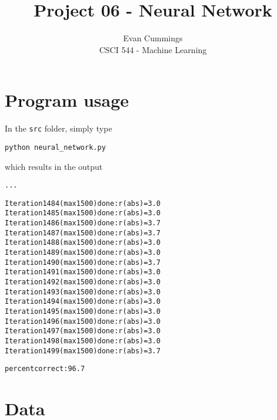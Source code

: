
\DeclareMathOperator*{\argmax}{arg\,max}

\usepackage[top=.5in, bottom=1in, left=.75in, right=.75in]{geometry}
\usepackage{framed}
\setlength{\columnsep}{8mm}


\small
\twocolumn

\title{Project 06 - Neural Network}
\author{Evan Cummings\\
CSCI 544 - Machine Learning}

\maketitle

\section{Program usage}

In the \texttt{src} folder, simply type

\centerline{\texttt{python neural\_network.py}}

\noindent which results in the output

\begin{shaded}
\scriptsize
\begin{alltt}
...

Iteration 1484 (max 1500) done: r (abs) = 3.0% (tol 2.0%) 
Iteration 1485 (max 1500) done: r (abs) = 3.0% (tol 2.0%) 
Iteration 1486 (max 1500) done: r (abs) = 3.7% (tol 2.0%) 
Iteration 1487 (max 1500) done: r (abs) = 3.7% (tol 2.0%) 
Iteration 1488 (max 1500) done: r (abs) = 3.0% (tol 2.0%) 
Iteration 1489 (max 1500) done: r (abs) = 3.0% (tol 2.0%) 
Iteration 1490 (max 1500) done: r (abs) = 3.7% (tol 2.0%) 
Iteration 1491 (max 1500) done: r (abs) = 3.0% (tol 2.0%) 
Iteration 1492 (max 1500) done: r (abs) = 3.0% (tol 2.0%) 
Iteration 1493 (max 1500) done: r (abs) = 3.0% (tol 2.0%) 
Iteration 1494 (max 1500) done: r (abs) = 3.0% (tol 2.0%) 
Iteration 1495 (max 1500) done: r (abs) = 3.0% (tol 2.0%) 
Iteration 1496 (max 1500) done: r (abs) = 3.0% (tol 2.0%) 
Iteration 1497 (max 1500) done: r (abs) = 3.0% (tol 2.0%) 
Iteration 1498 (max 1500) done: r (abs) = 3.0% (tol 2.0%) 
Iteration 1499 (max 1500) done: r (abs) = 3.7% (tol 2.0%) 

percent correct: 96.7%

\end{alltt}
\small
\end{shaded}

\section{Data}

